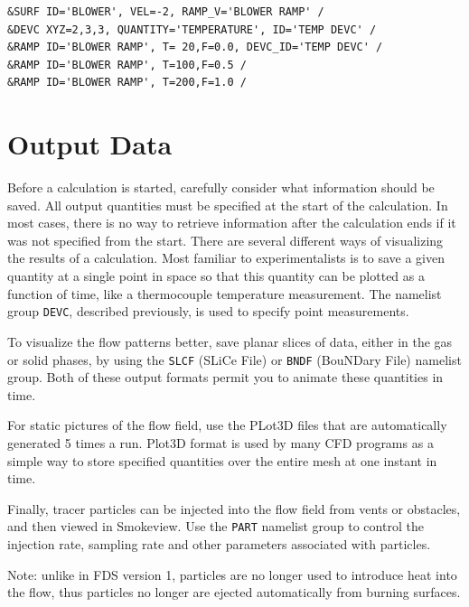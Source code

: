 \documentclass[11pt]{book}
\newcommand{\ct}{\tt\small}
\begin{document}
\footnotesize
\begin{verbatim}
&SURF ID='BLOWER', VEL=-2, RAMP_V='BLOWER RAMP' /
&DEVC XYZ=2,3,3, QUANTITY='TEMPERATURE', ID='TEMP DEVC' /
&RAMP ID='BLOWER RAMP', T= 20,F=0.0, DEVC_ID='TEMP DEVC' /
&RAMP ID='BLOWER RAMP', T=100,F=0.5 /
&RAMP ID='BLOWER RAMP', T=200,F=1.0 /
\end{verbatim}
\normalsize



%
\newpage



\chapter{Output Data}
\label{info:outputdata}

Before a calculation is started, carefully consider
what information should be saved. All output quantities must be specified
at the start of the calculation. In most cases, there is no way to
retrieve information after the calculation ends if it was not specified from the start.
There are several different ways of visualizing the results of a
calculation. Most familiar to
experimentalists is to save a given quantity at a single point in space so
that this quantity can be plotted as a function of time, like a
thermocouple temperature measurement. The namelist group {\ct DEVC},
described previously, is used to specify point measurements.

To visualize the flow patterns better, save planar
slices of data, either in the gas or solid phases, by using the
{\ct SLCF} (SLiCe File) or {\ct BNDF} (BouNDary File) namelist group.
Both of these output formats permit you to animate these quantities in
time.

For static pictures of the flow field, use the PLot3D files
that are automatically generated 5 times a run. Plot3D format is used by many CFD programs as a simple
way to store specified quantities over the entire mesh at one instant in
time.

Finally, tracer particles can be injected into the flow field from
vents or obstacles, and then viewed in Smokeview. Use the {\ct PART}
namelist group to control the injection rate, sampling rate and other
parameters associated with particles.

\begin{warning}
\noindent
Note: unlike in FDS version 1,
particles are no longer used to introduce heat into the flow, thus
particles no longer are ejected automatically from burning surfaces.
\end{warning}
\end{document}
